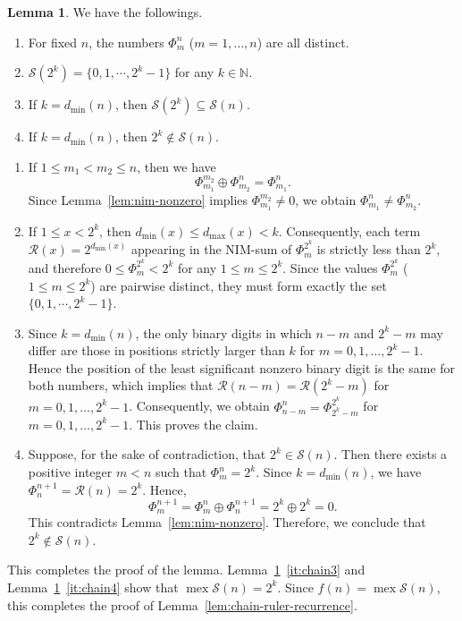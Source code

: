 \documentclass[a4paper,11pt]{amsart}
\theoremstyle{definition}
\newtheorem{lem}{Lemma}[section]
\newenvironment{demo}[1]{%
  \trivlist
  \item[\hskip\labelsep
        {\bf #1.}]
}{%
\hfill\qedsymbol
  \endtrivlist
}
\newcommand{\mex}{\operatorname{mex}}
\numberwithin{equation}{section}
\def\Non{\mathbb{N}}
\def\fnh#1{\mathscr{R}\left({#1}\right)}
\def\fnH#1#2{\Phi_{#1}^{#2}}
\def\fnS#1{\mathscr{S}\left({#1}\right)}
\def\placemax#1{d_{\max}\left({#1}\right)}
\def\placemin#1{d_{\min}\left({#1}\right)}
\begin{document}
%
%
%
\begin{lem}\label{lem:chain-ruler}
We have the followings.
%
\begin{enumerate}[label=\roman*)]
%
\item\label{it:chain1}
For fixed $n$, the numbers $\fnH{m}{n}$ ($m=1,\dots,n$) are all distinct.
%
\item\label{it:chain2}
$\fnS{2^{k}}=\{0,1,\cdots,2^{k}-1\}$ for any $k\in\Non$.
%
\item\label{it:chain3}
If $k=\placemin{n}$,
then $\fnS{2^{k}}\subseteq \fnS{n}$.
%
\item\label{it:chain4}
If $k=\placemin{n}$,
then $2^{k}\not\in \fnS{n}$.
%
\end{enumerate}
%
\end{lem}
%
\begin{demo}{Proof}
%
\begin{enumerate}[label=\roman*)]
%
\item
If $1\leq m_{1}< m_{2}\leq n$,
then we have
\[
\fnH{m_{1}}{m_{2}}\oplus\fnH{m_{2}}{n}=\fnH{m_{1}}{n}.
\]
Since Lemma~\ref{lem:nim-nonzero} implies $\fnH{m_{1}}{m_{2}}\neq0$,
we obtain $\fnH{m_{1}}{n}\neq\fnH{m_{2}}{n}$.
%
\item
If $1\leq x<2^{k}$, then $\placemin{x}\leq\placemax{x}<k$.
Consequently, each term $\fnh{x}=2^{\placemin{x}}$ appearing in the NIM-sum of $\fnH{m}{2^{k}}$ is strictly less than $2^k$, and therefore
$0\leq \fnH{m}{2^{k}}<2^{k}$ for any $1\leq m\leq 2^{k}$.
Since the values $\fnH{m}{2^{k}}$ ($1\leq m\leq 2^{k}$) are pairwise distinct, 
they must form exactly the set $\{0,1,\cdots,2^{k}-1\}$.
%
\item
Since $k=\placemin{n}$,
the only binary digits in which $n-m$ and $2^{k}-m$
may differ are those in positions strictly larger than $k$ for $m=0,1,\dots,2^{k}-1$.
Hence the position of the least significant nonzero binary digit is the same for both numbers,
which implies that $\fnh{n-m}=\fnh{2^{k}-m}$
for $m=0,1,\dots,2^{k}-1$.
Consequently, we obtain $\fnH{n-m}{n}=\fnH{2^{k}-m}{2^{k}}$ for $m=0,1,\dots,2^{k}-1$.
This proves the claim.
%
\item
%
Suppose, for the sake of contradiction, that $2^{k}\in \fnS{n}$.
Then there exists a positive integer $m<n$ such that $\fnH{m}{n}=2^{k}$.
Since $k=\placemin{n}$,
we have $\fnH{n}{n+1}=\fnh{n}=2^{k}$.
Hence,
\[
\fnH{m}{n+1}=\fnH{m}{n}\oplus \fnH{n}{n+1}=2^{k}\oplus 2^{k}=0.
\]
This contradicts Lemma~\ref{lem:nim-nonzero}.
%
Therefore, we conclude that $2^{k}\not\in \fnS{n}$.
%
\end{enumerate}
%
This completes the proof of the lemma.
%
\end{demo}
%
Lemma~\ref{lem:chain-ruler}~\ref{it:chain3} and Lemma~\ref{lem:chain-ruler}~\ref{it:chain4} show that $\mex \fnS{n}=2^{k}$.
%
Since $f(n)=\mex \fnS{n}$,
this completes the proof of Lemma~\ref{lem:chain-ruler-recurrence}.
%
%
%
%
%
\end{document}
